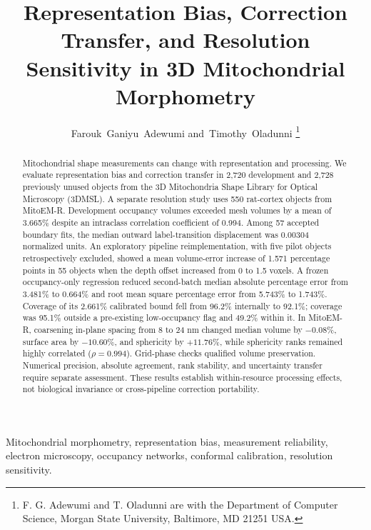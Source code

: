\documentclass[journal]{IEEEtran}
\begin{document}
\title{Representation Bias, Correction Transfer, and Resolution Sensitivity in 3D Mitochondrial Morphometry}
\author{Farouk~Ganiyu~Adewumi and~Timothy~Oladunni%
\thanks{F. G. Adewumi and T. Oladunni are with the Department of Computer Science, Morgan State University, Baltimore, MD 21251 USA.}}
\maketitle

\begin{abstract}
Mitochondrial shape measurements can change with representation and processing. We evaluate representation bias and correction transfer in 2,720 development and 2,728 previously unused objects from the 3D Mitochondria Shape Library for Optical Microscopy (3DMSL). A separate resolution study uses 550 rat-cortex objects from MitoEM-R. Development occupancy volumes exceeded mesh volumes by a mean of 3.665\% despite an intraclass correlation coefficient of 0.994. Among 57 accepted boundary fits, the median outward label-transition displacement was 0.00304 normalized units. An exploratory pipeline reimplementation, with five pilot objects retrospectively excluded, showed a mean volume-error increase of 1.571 percentage points in 55 objects when the depth offset increased from 0 to 1.5 voxels. A frozen occupancy-only regression reduced second-batch median absolute percentage error from 3.481\% to 0.664\% and root mean square percentage error from 5.743\% to 1.743\%. Coverage of its 2.661\% calibrated bound fell from 96.2\% internally to 92.1\%; coverage was 95.1\% outside a pre-existing low-occupancy flag and 49.2\% within it. In MitoEM-R, coarsening in-plane spacing from 8 to 24 nm changed median volume by $-0.08$\%, surface area by $-10.60$\%, and sphericity by $+11.76$\%, while sphericity ranks remained highly correlated ($\rho=0.994$). Grid-phase checks qualified volume preservation. Numerical precision, absolute agreement, rank stability, and uncertainty transfer require separate assessment. These results establish within-resource processing effects, not biological invariance or cross-pipeline correction portability.
\end{abstract}

\begin{IEEEkeywords}
Mitochondrial morphometry, representation bias, measurement reliability, electron microscopy, occupancy networks, conformal calibration, resolution sensitivity.
\end{IEEEkeywords}
\end{document}
